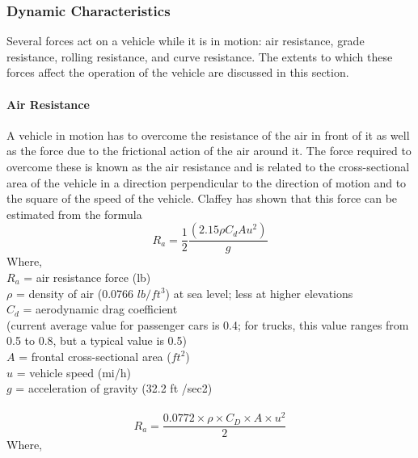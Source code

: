 \subsubsection{Dynamic Characteristics}
Several forces act on a vehicle while it is in motion: air resistance, grade resistance, rolling resistance, and curve resistance. The extents to which these forces affect the operation of the vehicle are discussed in this section.
\paragraph{Air Resistance}
A vehicle in motion has to overcome the resistance of the air in front of it as well as the force due to the frictional action of the air around it. The force required to overcome these is known as the air resistance and is related to the cross-sectional area of the vehicle in a direction perpendicular to the direction of motion and to the square of the speed of the vehicle. Claffey has shown that this force can be estimated from the formula
\begin{equation}
	R_a = \frac{1}{2}\frac{(2.15\rho C_d A u^2)}{g}
\end{equation}
Where,\\
\hspace*{10mm}$R_a$ = air resistance force (lb)\\
\hspace*{10mm}$\rho$ = density of air (0.0766 $ lb/ft^3 $) at sea level; less at higher elevations\\
\hspace*{10mm}$C_d$ = aerodynamic drag coefficient\\
\hspace*{10mm}(current average value for passenger cars is 0.4; for trucks, this value ranges from 0.5 to 0.8, but a typical value is 0.5)\\
\hspace*{10mm}$A$ = frontal cross-sectional area ($ ft^2 $)\\
\hspace*{10mm}$u$ = vehicle speed (mi/h)\\
\hspace*{10mm}$g$ = acceleration of gravity (32.2 ft /sec2)\\\\
\begin{equation}
	R_a = \frac{0.0772 \times \rho \times C_D \times A \times u^2}{2}
\end{equation}
Where,\\
